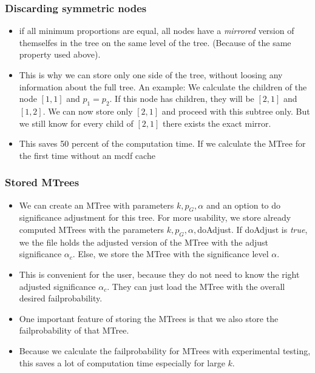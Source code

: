 \subsubsection{Discarding symmetric nodes}\label{subsubsec:discarding-symmetric-nodes}
\begin{itemize}
\item if all minimum proportions are equal, all nodes have a \textit{mirrored} version of themselfes in the tree on the same level of the tree. (Because of the same property used above).
\item This is why we can store only one side of the tree, without loosing any information about the full tree. An example: We calculate the children of the node $[1,1]$ and $p_1 = p_2$. If this node has children, they will be $[2,1]$ and $[1,2]$. We can now store only $[2,1]$ and proceed with this subtree only. But we still know for every child of $[2,1]$ there exists the exact mirror.
\item This saves 50 percent of the computation time. If we calculate the MTree for the first time without an mcdf cache
\end{itemize}
\subsubsection{Stored MTrees}\label{subsubsec:stored-mtrees}
\begin{itemize}
\item We can create an MTree with parameters $k,p_G , \alpha$ and an option to do significance adjustment for this tree. For more usability, we store already computed MTrees with the parameters $k,p_G , \alpha,$doAdjust. If doAdjust is \textit{true}, we the file holds the adjusted version of the MTree with the adjust significance $\alpha_c$. Else, we store the MTree with the significance level $\alpha$.
\item This is convenient for the user, because they do not need to know the right adjusted significance $\alpha_c$. They can just load the MTree with the overall desired failprobability.
\item One important feature of storing the MTrees is that we also store the failprobability of that MTree.
\item Because we calculate the failprobability for MTrees with experimental testing, this saves a lot of computation time especially for large $k$.
\end{itemize}
